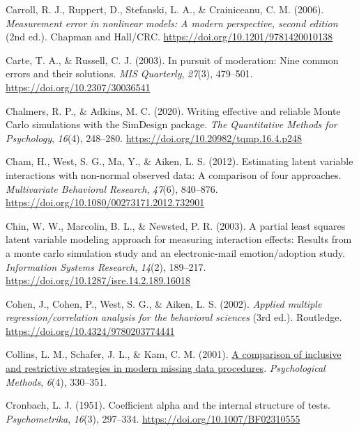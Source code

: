 \documentclass[
  man,mask]{apa6}
\newlength{\cslhangindent}
\newenvironment{CSLReferences}[2] %
 {\begin{list}{}{%
  \setlength{\itemindent}{0pt}
  \setlength{\leftmargin}{0pt}
  \setlength{\parsep}{0pt}
  \ifodd #1
   \setlength{\leftmargin}{\cslhangindent}
   \setlength{\itemindent}{-1\cslhangindent}
  \fi
  \setlength{\itemsep}{#2\baselineskip}}}
 {\end{list}}
\begin{document}
\begin{CSLReferences}{1}{0}
Carroll, R. J., Ruppert, D., Stefanski, L. A., \& Crainiceanu, C. M. (2006). \emph{Measurement error in nonlinear models: {A} modern perspective, second edition} (2nd ed.). {Chapman and Hall/CRC}. \url{https://doi.org/10.1201/9781420010138}

Carte, T. A., \& Russell, C. J. (2003). In pursuit of moderation: {Nine} common errors and their solutions. \emph{MIS Quarterly}, \emph{27}(3), 479--501. \url{https://doi.org/10.2307/30036541}

Chalmers, R. P., \& Adkins, M. C. (2020). Writing effective and reliable {Monte Carlo} simulations with the {SimDesign} package. \emph{The Quantitative Methods for Psychology}, \emph{16}(4), 248--280. \url{https://doi.org/10.20982/tqmp.16.4.p248}

Cham, H., West, S. G., Ma, Y., \& Aiken, L. S. (2012). Estimating latent variable interactions with non-normal observed data: A comparison of four approaches. \emph{Multivariate Behavioral Research}, \emph{47}(6), 840--876. \url{https://doi.org/10.1080/00273171.2012.732901}

Chin, W. W., Marcolin, B. L., \& Newsted, P. R. (2003). A partial least squares latent variable modeling approach for measuring interaction effects: Results from a monte carlo simulation study and an electronic-mail emotion/adoption study. \emph{Information Systems Research}, \emph{14}(2), 189--217. \url{https://doi.org/10.1287/isre.14.2.189.16018}

Cohen, J., Cohen, P., West, S. G., \& Aiken, L. S. (2002). \emph{Applied multiple regression/correlation analysis for the behavioral sciences} (3rd ed.). Routledge. \url{https://doi.org/10.4324/9780203774441}

Collins, L. M., Schafer, J. L., \& Kam, C. M. (2001). \href{}{A comparison of inclusive and restrictive strategies in modern missing data procedures}. \emph{Psychological Methods}, \emph{6}(4), 330--351.

Cronbach, L. J. (1951). Coefficient alpha and the internal structure of tests. \emph{Psychometrika}, \emph{16}(3), 297--334. \url{https://doi.org/10.1007/BF02310555}


\end{CSLReferences}
\end{document}
